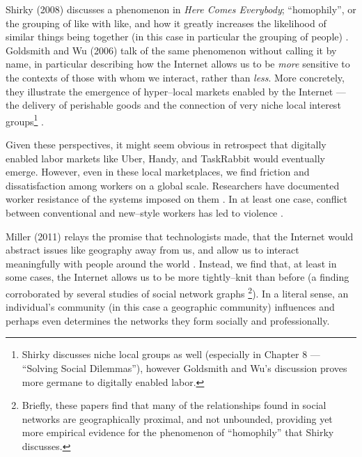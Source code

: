 \documentclass[11pt]{article}
\begin{document}
Shirky (2008) discusses a phenomenon in \textit{Here Comes Everybody};
``homophily'', or the grouping of like with like,
and how it greatly increases the likelihood of similar things being together (in this case in particular the grouping of people)
\cite{shirky2008here}.
Goldsmith and Wu (2006) talk of the same phenomenon without calling it by name,
in particular describing how the Internet allows us to be \textit{more} sensitive to the contexts of those with whom we interact,
rather than \textit{less}.
More concretely, they illustrate the emergence of hyper--local markets enabled by the Internet
--- the delivery of perishable goods
and the connection of very niche local interest groups\footnote{Shirky discusses niche local groups as well (especially in Chapter 8 --- ``Solving Social Dilemmas''), however Goldsmith and Wu's discussion proves more germane to digitally enabled labor.}
\cite{goldsmith2006controls}.

Given these perspectives, it might seem obvious in retrospect that digitally enabled labor markets
like Uber, Handy, and TaskRabbit
would eventually emerge.
However, even in these local marketplaces, we find friction and dissatisfaction among workers on a global scale.
Researchers have documented worker resistance of the systems imposed on them
\cite{uberAlgorithm}.
In at least one case, conflict between conventional and new--style workers has led to violence \cite{uberRiots}.




Miller (2011) relays the promise that technologists made,
that the Internet would abstract issues like geography away from us,
and allow us to interact meaningfully with people around the world
\cite{miller2011understanding}.
Instead, we find that, at least in some cases,
the Internet allows us to be more tightly--knit than before
(a finding corroborated by several studies of social network graphs
\cite{mcpherson2001birds,takhteyev2012geography}\footnote{Briefly, these papers find that many of the relationships found in social networks are geographically proximal, and not unbounded, providing yet more empirical evidence for the phenomenon of ``homophily'' that Shirky discusses.}).
In a literal sense,
an individual's community (in this case a geographic community) influences and perhaps even determines the networks they form socially and professionally.




\end{document}

